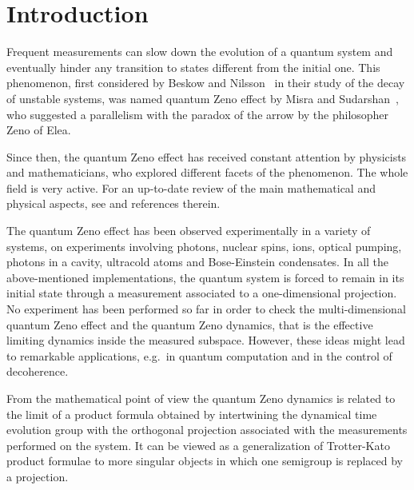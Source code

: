 \documentclass[aip,jmp,12pt
]{revtex4}
\theoremstyle{definition}
\begin{document}
\pacs{}%

\maketitle %


\section{\label{sec:intro}Introduction}


Frequent measurements can slow down the evolution of a quantum system and eventually
hinder any transition to states different from the initial one. This
phenomenon, first considered by Beskow and Nilsson~\cite{beskow} in their
study of the decay of unstable systems,
was  named quantum Zeno
effect by Misra and Sudarshan~\cite{misra},
who suggested a parallelism with the paradox of the arrow by the
philosopher Zeno of Elea.

Since then,  the quantum Zeno effect has received constant attention by physicists and mathematicians, who explored different facets of the phenomenon. The whole field is very active. For an up-to-date review of the main mathematical and physical aspects, see \cite{ZenoMP} and references therein.


The  quantum Zeno effect has been observed  experimentally in a variety of systems, on
experiments involving photons, nuclear spins, ions,  optical pumping, photons in a cavity, ultracold atoms and Bose-Einstein condensates. In all the above-mentioned implementations, the quantum system is forced to remain in its
initial state through a measurement associated to a one-dimensional projection. No experiment has been performed so far in order to check the multi-dimensional quantum Zeno effect and the quantum Zeno dynamics, that is the effective limiting dynamics inside the measured subspace. However, these ideas might lead to remarkable applications, e.g.\ in quantum computation and in the control of decoherence.


From the mathematical point of view the quantum Zeno dynamics is related to the
limit of a product formula obtained by intertwining the dynamical time evolution group  with the orthogonal projection associated with the measurements performed on the system. It can be viewed as a generalization of Trotter-Kato product formulae \cite{Trotter1,Trotter2,Kato1,Chernoff}  to more singular objects in which one semigroup is replaced by a  projection.
\end{document}

